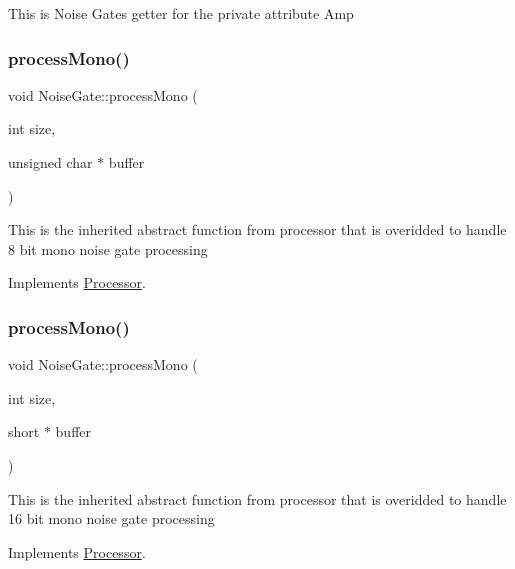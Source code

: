 This is Noise Gate\textquotesingle{}s getter for the private attribute Amp \mbox{\label{classNoiseGate_ae8fd94876fcfe26528fb62df850f92f9}} 
\subsubsection{\texorpdfstring{process\+Mono()}{processMono()}\hspace{0.1cm}{\footnotesize\ttfamily [1/2]}}
{\footnotesize\ttfamily void Noise\+Gate\+::process\+Mono (\begin{DoxyParamCaption}\item[{int}]{size,  }\item[{unsigned char $\ast$}]{buffer }\end{DoxyParamCaption})\hspace{0.3cm}{\ttfamily [virtual]}}

This is the inherited abstract function from processor that is overidded to handle 8 bit mono noise gate processing 

Implements \hyperlink{classProcessor_aae6af1473510f56839f3e15328962fb0}{Processor}.

\mbox{\label{classNoiseGate_a8cb287300db269efcb8130a9f21d205b}} 
\subsubsection{\texorpdfstring{process\+Mono()}{processMono()}\hspace{0.1cm}{\footnotesize\ttfamily [2/2]}}
{\footnotesize\ttfamily void Noise\+Gate\+::process\+Mono (\begin{DoxyParamCaption}\item[{int}]{size,  }\item[{short $\ast$}]{buffer }\end{DoxyParamCaption})\hspace{0.3cm}{\ttfamily [virtual]}}

This is the inherited abstract function from processor that is overidded to handle 16 bit mono noise gate processing 

Implements \hyperlink{classProcessor_ab24fa87b5eb6246cf8599756b3b5862d}{Processor}.

